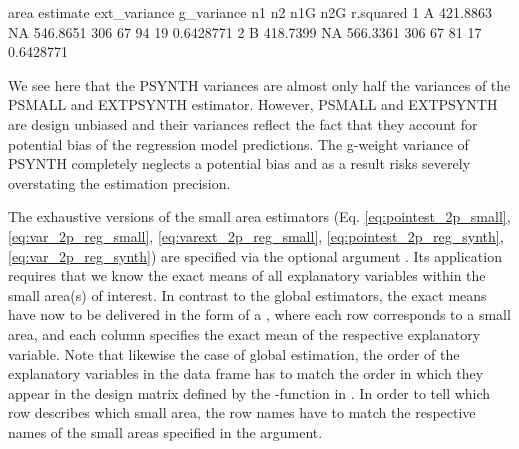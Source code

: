 \begin{small}
\begin{Schunk}
\begin{Soutput}
  area estimate ext_variance g_variance  n1 n2 n1G n2G r.squared
1    A 421.8863           NA   546.8651 306 67  94  19 0.6428771
2    B 418.7399           NA   566.3361 306 67  81  17 0.6428771
\end{Soutput}
\end{Schunk}
\end{small}

We see here that the PSYNTH variances are almost only half the variances of the PSMALL and EXTPSYNTH estimator. However, PSMALL and EXTPSYNTH are design unbiased and their variances reflect the fact that they account for potential bias of the regression model predictions. The g-weight variance of PSYNTH completely neglects a potential bias and as a result risks severely overstating the estimation precision.\par

The exhaustive versions of the small area estimators (Eq. \ref{eq:pointest_2p_small}, \ref{eq:var_2p_reg_small}, \ref{eq:varext_2p_reg_small}, \ref{eq:pointest_2p_reg_synth}, \ref{eq:var_2p_reg_synth}) are specified via the optional argument . Its application requires that we know the exact means of all explanatory variables within the small area(s) of interest. In contrast to the global estimators, the exact means have now to be delivered in the form of a , where each row corresponds to a small area, and each column specifies the exact mean of the respective explanatory variable. Note that likewise the case of global estimation, the order of the explanatory variables in the data frame has to match the order in which they appear in the design matrix defined by the -function in . In order to tell  which row describes which small area, the row names have to match the respective names of the small areas specified in the  argument.

